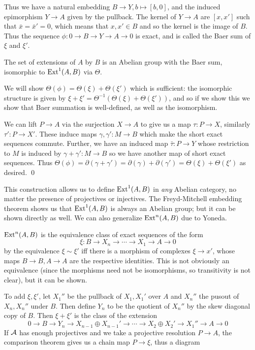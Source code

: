     Thus we have a natural embedding $B\to Y,b\mapsto[b,0]$, and the induced epimorphism $Y\to A$ given by the pullback.
    The kernel of $Y\to A$ are $[x,x']$ such that $\bar x=\bar x'=0$, which means that $x,x'\in B$ and so the kernel is the image of $B$.
    Thus the sequence $\phi\colon0\to B\to Y\to A\to0$ is exact, and is called the {\emphcolor Baer sum} of $\xi$ and $\xi'$.

\edefn

\bcoro

    The set of extensions of $A$ by $B$ is an Abelian group with the Baer sum, isomorphic to ${\rm Ext}^1(A,B)$ via $\Theta$.

\ecoro

\bproof

    We will show $\Theta(\phi)=\Theta(\xi)+\Theta(\xi')$ which is sufficient: the isomorphic structure is given by $\xi+\xi'=\Theta^{-1}(\Theta(\xi)+\Theta(\xi'))$,
    and so if we show this we show that Baer summation is well-defined, as well as the isomorphism.

    We can lift $P\to A$ via the surjection $X\to A$ to give us a map $\tau\colon P\to X$, similarly $\tau'\colon P\to X'$.
    These induce maps $\gamma,\gamma'\colon M\to B$ which make the short exact sequences commute.
    Further, we have an induced map $\bar\tau\colon P\to Y$ whose restriction to $M$ is induced by $\gamma+\gamma'\colon M\to B$ so we have another map of short exact sequences.
    Thus $\Theta(\phi)=\partial(\gamma+\gamma')=\partial(\gamma)+\partial(\gamma')=\Theta(\xi)+\Theta(\xi')$ as desired.
    \qed

\eproof

This construction allows us to define ${\rm Ext}^1(A,B)$ in {\it any\/} Abelian category, no matter the presence of projectives or injectives.
The Freyd-Mitchell embedding theorem shows us that ${\rm Ext}^1(A,B)$ is always an Abelian group; but it can be shown directly as well.
We can also generalize ${\rm Ext}^n(A,B)$ due to Yoneda.

${\rm Ext}^n(A,B)$ is the equivalence class of exact sequences of the form
$$ \xi\colon B\to X_n\to\cdots\to X_1\to A\to 0 $$
by the equivalence $\xi\sim\xi'$ iff there is a morphism of complexes $\xi\to x'$, whose maps $B\to B,A\to A$ are the respective identities.
This is not obviously an equivalence (since the morphisms need not be isomorphisms, so transitivity is not clear), but it can be shown.

To add $\xi,\xi'$, let $X_1''$ be the pullback of $X_1,X_1'$ over $A$ and $X_n''$ the pusout of $X_n,X_n''$ under $B$.
Then define $Y_n$ to be the quotient of $X_n''$ by the skew diagonal copy of $B$.
Then $\xi+\xi'$ is the class of the extension
$$ 0 \to B \to Y_n \to X_{n-1}\oplus X_{n-1}' \to \cdots \to X_2 \oplus X_2' \to X_1'' \to A \to 0 $$
If ${{\cal A}}$ has enough projectives and we take a projective resolution $P\to A$, the comparison theorem gives us a chain map $P\to\xi$, thus a diagram

